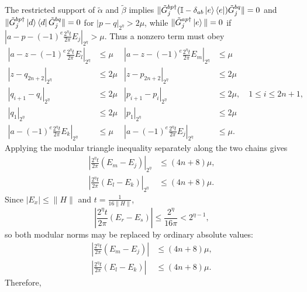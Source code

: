\documentclass[aps,floatfix,10pt,amssymb,amsfont,amsmath,superscriptaddress,float,nofootinbib,longbibliography,nobalancelastpage,twocolumn]{revtex4-2}
\begin{document}
\begin{widetext}
The restricted support of $\tilde\alpha$ and $\tilde\beta$ implies
$\|\tilde G^{bp\dagger}_{j}(\mathbb{I} - \delta_{ab}\ket{e}\bra{e})\tilde G^{bq}_{j}\| = 0$ and
$\|\tilde G^{bp\dagger}_{j}\ket{d}\bra{d}\tilde G^{bq}_{j}\| = 0$
for $|p-q|_{2^{\eta}} > 2\mu$, while
$\|\tilde G^{ap \dagger}_j \ket{e}\| = 0$ if
$|a-p-(-1)^e\frac{2^{\eta}t}{2\pi}E_j|_{2^\eta}>\mu$.  Thus a nonzero
term must obey
\begin{equation}
\begin{aligned}
    |a-z-(-1)^e\tfrac{2^{\eta}t}{2\pi}E_l|_{2^{\eta}} &\leq \mu
    &|a-z-(-1)^e\tfrac{2^{\eta}t}{2\pi}E_m|_{2^{\eta}} &\leq \mu\\
    |z-q_{2n+2}|_{2^{\eta}} &\leq 2\mu & |z-p_{2n+2}|_{2^{\eta}} &\leq 2\mu\\
    |q_{i+1}-q_i|_{2^{\eta}} &\leq 2\mu
    &|p_{i+1}-p_i|_{2^{\eta}} &\leq 2\mu,\quad 1\leq i\leq2n+1,\\
    |q_1|_{2^{\eta}} &\leq 2\mu & |p_1|_{2^{\eta}} &\leq 2\mu\\
    |a-(-1)^{e}\tfrac{2^{\eta}t}{2\pi}E_k|_{2^{\eta}} &\leq \mu
    &|a-(-1)^{e}\tfrac{2^{\eta}t}{2\pi}E_j|_{2^{\eta}}& \leq \mu.
\end{aligned}
\label{eq:conjE}
\end{equation}
Applying the modular triangle inequality separately along the two chains gives
\begin{equation}
\begin{aligned}
    \left|\frac{2^{\eta}t}{2\pi}(E_m-E_j)\right|_{2^{\eta}}&\leq(4n+8)\mu,\\
    \left|\frac{2^{\eta}t}{2\pi}(E_l-E_k)\right|_{2^{\eta}}&\leq(4n+8)\mu.
\end{aligned}
\end{equation}
Since $|E_x|\leq\|H\|$ and $t=\frac{1}{16\|H\|}$,
\begin{equation*}
    \left|\frac{2^{\eta}t}{2\pi}(E_r-E_s)\right|
    \leq \frac{2^{\eta}}{16\pi}<2^{\eta-1},
\end{equation*}
so both modular norms may be replaced by ordinary absolute values:
\begin{equation}
\label{eq:energiessame}
\begin{aligned}
    \left|\frac{2^{\eta}t}{2\pi}(E_m-E_j)\right|&\leq(4n+8)\mu,\\
    \left|\frac{2^{\eta}t}{2\pi}(E_l-E_k)\right|&\leq(4n+8)\mu.
\end{aligned}
\end{equation}
Therefore,
\begin{equation}

\end{equation}
\end{widetext}
\end{document}
